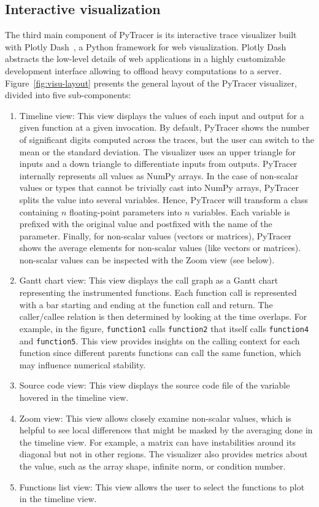 \documentclass[11pt]{article}
\newcommand{\pytracer}[0]{PyTracer\xspace}
\begin{document}
\subsection{Interactive visualization}
The third main component of \pytracer is its interactive trace visualizer built with Plotly Dash~\cite{plotly}, a Python framework for web visualization.
Plotly Dash abstracts the low-level details of web applications in a highly customizable development interface allowing to offload heavy computations to a server. 
Figure~\ref{fig:visu-layout} presents the general layout of the \pytracer visualizer, divided into five sub-components:
\begin{enumerate}
 \item Timeline view: This view displays the values of each input and output for a given function at a given invocation. By default, \pytracer shows the number of significant digits computed across the traces, but the user can switch to the mean or the standard deviation. The visualizer uses an upper triangle for inputs and a down triangle to differentiate inputs from outputs. \pytracer internally represents all values as NumPy arrays.    In the case of non-scalar values or types that cannot be trivially cast into NumPy arrays, \pytracer splits the value into several variables. Hence, \pytracer will transform a class containing $n$ floating-point parameters into $n$ variables. Each variable is prefixed with the original value and postfixed with the name of the parameter. 
    Finally, for non-scalar values (vectors or matrices), \pytracer shows the average elements for non-scalar values (like vectors or matrices). non-scalar values can be inspected with the Zoom view (see below).
 \item Gantt chart view: This view displays the call graph as a Gantt chart representing the instrumented functions. Each function call is represented with a bar starting and ending at the function call and return.
    The caller/callee relation is then determined by looking at the time overlaps.
    For example, in the figure, \texttt{function1} calls \texttt{function2} that itself calls \texttt{function4} and \texttt{function5}. 
    This view provides insights on the calling context for each function since different parents functions can call the same function, which may influence numerical stability. 
 \item  Source code view: This view displays the source code file of the variable hovered in the timeline view. 
 \item Zoom view: This view allows closely examine non-scalar values, which is helpful to see local differences that might be masked by the averaging done in the timeline view. For example, a matrix can have instabilities around its diagonal but not in other regions.
    The visualizer also provides metrics about the value, such as the array shape, infinite norm, or condition number.
\item  Functions list view: This view allows the user to select the functions to plot in the timeline view.
\end{enumerate}
\end{document}

